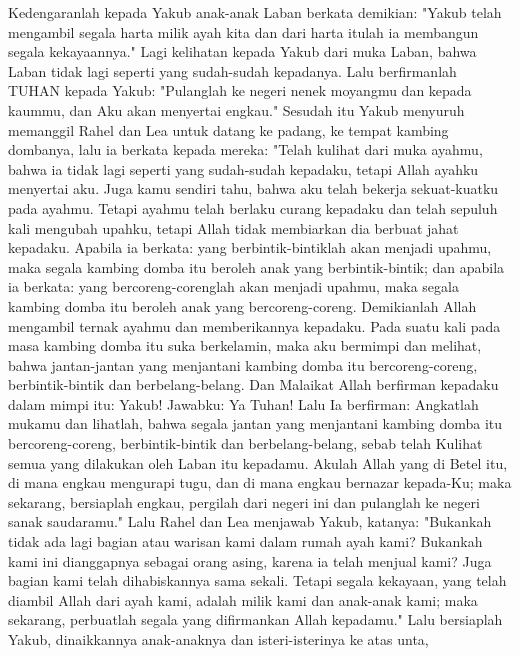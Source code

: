 \begin{biblechapter} %
 Kedengaranlah kepada Yakub anak-anak Laban berkata demikian: "Yakub telah mengambil segala harta milik ayah kita dan dari harta itulah ia membangun segala kekayaannya."
\verse Lagi kelihatan kepada Yakub dari muka Laban, bahwa Laban tidak lagi seperti yang sudah-sudah kepadanya.
\verse Lalu berfirmanlah TUHAN kepada Yakub: "Pulanglah ke negeri nenek moyangmu dan kepada kaummu, dan Aku akan menyertai engkau."
\verse Sesudah itu Yakub menyuruh memanggil Rahel dan Lea untuk datang ke padang, ke tempat kambing dombanya,
\verse lalu ia berkata kepada mereka: "Telah kulihat dari muka ayahmu, bahwa ia tidak lagi seperti yang sudah-sudah kepadaku, tetapi Allah ayahku menyertai aku.
\verse Juga kamu sendiri tahu, bahwa aku telah bekerja sekuat-kuatku pada ayahmu.
\verse Tetapi ayahmu telah berlaku curang kepadaku dan telah sepuluh kali mengubah upahku, tetapi Allah tidak membiarkan dia berbuat jahat kepadaku.
\verse Apabila ia berkata: yang berbintik-bintiklah akan menjadi upahmu, maka segala kambing domba itu beroleh anak yang berbintik-bintik; dan apabila ia berkata: yang bercoreng-corenglah akan menjadi upahmu, maka segala kambing domba itu beroleh anak yang bercoreng-coreng.
\verse Demikianlah Allah mengambil ternak ayahmu dan memberikannya kepadaku.
\verse Pada suatu kali pada masa kambing domba itu suka berkelamin, maka aku bermimpi dan melihat, bahwa jantan-jantan yang menjantani kambing domba itu bercoreng-coreng, berbintik-bintik dan berbelang-belang.
\verse Dan Malaikat Allah berfirman kepadaku dalam mimpi itu: Yakub! Jawabku: Ya Tuhan!
\verse Lalu Ia berfirman: Angkatlah mukamu dan lihatlah, bahwa segala jantan yang menjantani kambing domba itu bercoreng-coreng, berbintik-bintik dan berbelang-belang, sebab telah Kulihat semua yang dilakukan oleh Laban itu kepadamu.
\verse Akulah Allah yang di Betel itu, di mana engkau mengurapi tugu, dan di mana engkau bernazar kepada-Ku; maka sekarang, bersiaplah engkau, pergilah dari negeri ini dan pulanglah ke negeri sanak saudaramu."
\verse Lalu Rahel dan Lea menjawab Yakub, katanya: "Bukankah tidak ada lagi bagian atau warisan kami dalam rumah ayah kami?
\verse Bukankah kami ini dianggapnya sebagai orang asing, karena ia telah menjual kami? Juga bagian kami telah dihabiskannya sama sekali.
\verse Tetapi segala kekayaan, yang telah diambil Allah dari ayah kami, adalah milik kami dan anak-anak kami; maka sekarang, perbuatlah segala yang difirmankan Allah kepadamu."
\verse Lalu bersiaplah Yakub, dinaikkannya anak-anaknya dan isteri-isterinya ke atas unta,

\end{biblechapter}
